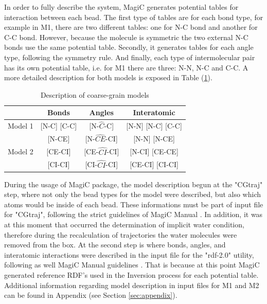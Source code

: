 \documentclass[10pt,a4paper,twoside]{article}
\begin{document}
 In order to fully describe the system, MagiC generates potential tables for interaction between each bead. The first type of tables are for each bond type, for example in M1, there are two different tables: one for N-C bond and another for C-C bond. However, because the molecule is symmetric the two external N-C bonds use the same potential table. Secondly, it generates tables for each angle type, following the symmetry rule. And finally, each type of intermolecular pair has its own potential table, i.e. for M1 there are three: N-N, N-C and C-C. A more detailed description for both models is exposed in Table (\ref{tab:potdes}).
  
 \begin{table}[ht!] 
  \centering
\begin{threeparttable}

  \caption{Description of coarse-grain models}

    \begin{tabular}{c|c|c|c}
    \toprule
    &  Bonds & Angles & Interatomic \\
    \midrule
    Model 1   & [N-C] [C-C]  & [N-$\widehat{C}$-C]  & [N-N] [N-C] [C-C]  \\
    \midrule
      			& [N-CE]  & [N-$\widehat{CE}$-CI]  & [N-N] [N-CE]   \\
      Model 2	& [CE-CI] &  [CE-$\widehat{CI}$-CI] &  [N-CI] [CE-CE]   \\
     			 & [CI-CI]  &  [CI-$\widehat{CI}$-CI] &  [CE-CI] [CI-CI]  \\
    \bottomrule
    \end{tabular}%
  \label{tab:potdes}%
\end{threeparttable} 
\end{table}

 During the usage of MagiC package, the model description begun at the "CGtraj" step, where  not only the bead types for the model were described, but also which atoms would be inside of each bead. These informations must be part of input file for "CGtraj", following the strict guidelines of MagiC Manual \cite{magicmanu}. In addition, it was at this moment that occurred the determination of implicit water condition, therefore during the recalculation of trajectories the water molecules were removed from the box. At the second step is where bonds, angles, and interatomic interactions were described in the input file for the "rdf-2.0" utility, following as well MagiC Manual guidelines \cite{magicmanu}.  That is because at this point MagiC generated reference RDF's used in the Inversion process for each potential table. Additional information regarding model description in input files for M1 and M2 can be found in Appendix (see Section \ref{sec:appendix}).
 
\end{document}
